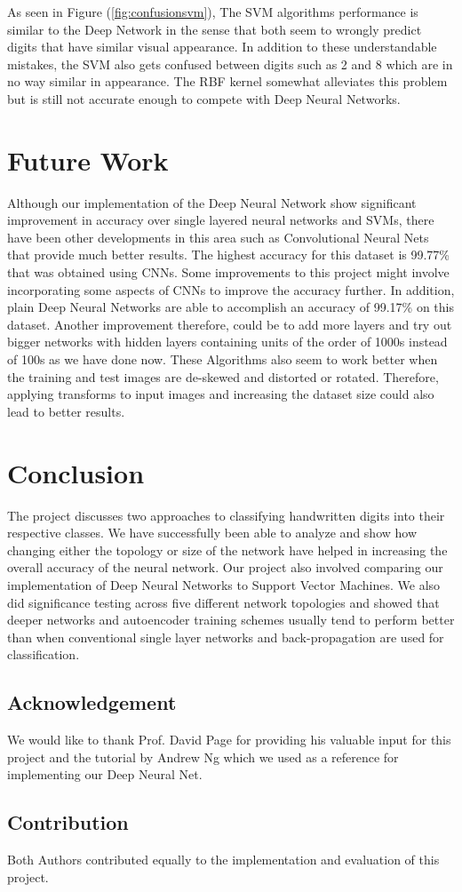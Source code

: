 \documentclass[10pt,twocolumn,letterpaper]{article}
\begin{document}
As seen in Figure (\ref{fig:confusionsvm}), The SVM algorithms performance is similar to the Deep Network in the sense that both seem to wrongly predict digits that have similar visual appearance. In addition to these understandable mistakes, the SVM also gets confused between digits such as 2 and 8 which are in no way similar in appearance. The RBF kernel somewhat alleviates this problem but is still not accurate enough to compete with Deep Neural Networks.

\section{Future Work}
Although our implementation of the Deep Neural Network show significant improvement in accuracy over single layered neural networks and SVMs, there have been other developments in this area such as Convolutional Neural Nets that provide much better results. The highest accuracy for this dataset is 99.77\% that was obtained using CNNs. Some improvements to this project might involve incorporating some aspects of CNNs to improve the accuracy further. In addition, plain Deep Neural Networks are able to accomplish an accuracy of 99.17\% on this dataset. Another improvement therefore, could be to add more layers and try out bigger networks with hidden layers containing units of the order of 1000s instead of 100s as we have done now. These Algorithms also seem to work better when the training and test images are de-skewed and distorted or rotated. Therefore, applying transforms to input images and increasing the dataset size could also lead to better results.

\section{Conclusion}
The project discusses two approaches to classifying handwritten digits into their respective classes. We have successfully been able to analyze and show how changing either the topology or size of the network have helped in increasing the overall accuracy of the neural network. Our project also involved comparing our implementation of Deep Neural Networks to Support Vector Machines. We also did significance testing across five different network topologies and showed that deeper networks and autoencoder training schemes usually tend to perform better than when  conventional single layer networks and back-propagation are used for classification.
\subsection*{Acknowledgement}
We would like to thank Prof. David Page for providing his valuable input for this project and the tutorial by Andrew Ng \cite{ANg13t} which we used as a reference for implementing our Deep Neural Net.
\subsection*{Contribution}
Both Authors contributed equally to the implementation and evaluation of this project.
{\small


}
\end{document}
